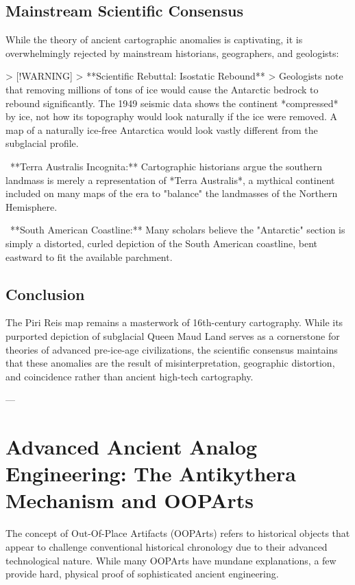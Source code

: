 \documentclass[aps,prd,11pt,onecolumn,superscriptaddress,nofootinbib,floatfix]{revtex4-2}
\begin{document}
\subsection{Mainstream Scientific Consensus}
While the theory of ancient cartographic anomalies is captivating, it is overwhelmingly rejected by mainstream historians, geographers, and geologists:


> [!WARNING]
> **Scientific Rebuttal: Isostatic Rebound**
> Geologists note that removing millions of tons of ice would cause the Antarctic bedrock to rebound significantly. The 1949 seismic data shows the continent *compressed* by ice, not how its topography would look naturally if the ice were removed. A map of a naturally ice-free Antarctica would look vastly different from the subglacial profile.


\textbullet~**Terra Australis Incognita:** Cartographic historians argue the southern landmass is merely a representation of *Terra Australis*, a mythical continent included on many maps of the era to "balance" the landmasses of the Northern Hemisphere.

\textbullet~**South American Coastline:** Many scholars believe the "Antarctic" section is simply a distorted, curled depiction of the South American coastline, bent eastward to fit the available parchment.



\subsection{Conclusion}
The Piri Reis map remains a masterwork of 16th-century cartography. While its purported depiction of subglacial Queen Maud Land serves as a cornerstone for theories of advanced pre-ice-age civilizations, the scientific consensus maintains that these anomalies are the result of misinterpretation, geographic distortion, and coincidence rather than ancient high-tech cartography.




---


\section{Advanced Ancient Analog Engineering: The Antikythera Mechanism and OOPArts}


The concept of Out-Of-Place Artifacts (OOPArts) refers to historical objects that appear to challenge conventional historical chronology due to their advanced technological nature. While many OOPArts have mundane explanations, a few provide hard, physical proof of sophisticated ancient engineering.
\end{document}
